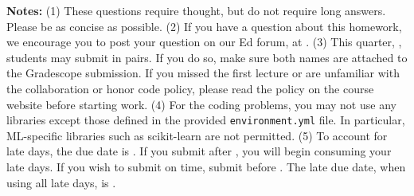 {\bf Notes:} 
(1) These questions require thought, but do not require long
answers. Please be as concise as possible.  
(2) If you have a question
about this homework, we encourage you to post your question on our
Ed forum, at \Ed. 
(3) This quarter, \qtr, students may submit in pairs. If you do so, make sure both names are attached to the Gradescope submission. If you
missed the first lecture or are unfamiliar with the collaboration or honor
code policy, please read the policy on the course website before starting work.
(4) For the coding problems, you may not
use any libraries except those defined in the provided \texttt{environment.yml}
file. In particular, ML-specific libraries such as scikit-learn are not
permitted. 
(5) To account for late days, the due date is \due. If you submit after
\due, you will begin consuming your
late days. If you wish to submit on time, submit before \due. The late due date, when using all late days, is \latedue. 

